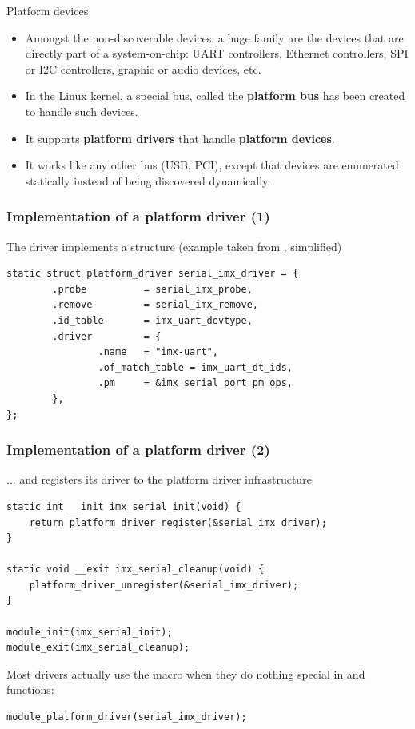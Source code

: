 \begin{frame}{Platform devices}
  \begin{itemize}
  \item Amongst the non-discoverable devices, a huge family are the
    devices that are directly part of a system-on-chip: UART
    controllers, Ethernet controllers, SPI or I2C controllers, graphic
    or audio devices, etc.
  \item In the Linux kernel, a special bus, called the {\bf platform
      bus} has been created to handle such devices.
  \item It supports {\bf platform drivers} that handle {\bf platform
      devices}.
  \item It works like any other bus (USB, PCI), except that devices
    are enumerated statically instead of being discovered dynamically.
  \end{itemize}
\end{frame}

\begin{frame}[fragile]
  \frametitle{Implementation of a platform driver (1)}
  The driver implements a 
  structure (example taken from ,
  simplified)
  \begin{block}{}
  \begin{verbatim}
static struct platform_driver serial_imx_driver = {
        .probe          = serial_imx_probe,
        .remove         = serial_imx_remove,
        .id_table       = imx_uart_devtype,
        .driver         = {
                .name   = "imx-uart",
                .of_match_table = imx_uart_dt_ids,
                .pm     = &imx_serial_port_pm_ops,
        },
};
\end{verbatim}
\end{block}
\end{frame}


\begin{frame}[fragile]
  \frametitle{Implementation of a platform driver (2)}
  ... and registers its driver to the platform driver infrastructure
  \begin{block}{}
  \begin{verbatim}
static int __init imx_serial_init(void) {
    return platform_driver_register(&serial_imx_driver);
}

static void __exit imx_serial_cleanup(void) {
    platform_driver_unregister(&serial_imx_driver);
}

module_init(imx_serial_init);
module_exit(imx_serial_cleanup);
  \end{verbatim}
\end{block}
Most drivers actually use the 
macro when they do nothing special in  and  functions:
  \begin{block}{}
  \begin{verbatim}
module_platform_driver(serial_imx_driver);
  \end{verbatim}
\end{block}
\end{frame}

